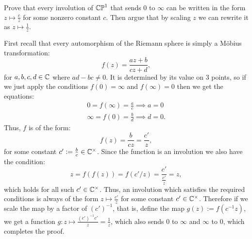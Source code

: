 \documentclass[11pt, a4paper]{article}
\begin{document}
\begin{exercise}
  Prove that every involution of $\mathbb{CP}^1$ that sends $0$ to $\infty$
  can be written in the form $z \mapsto \frac{c}{z}$ for some nonzero
  constant $c$.
  Then argue that by scaling $z$ we can rewrite it as $z \mapsto \frac{1}{z}$.
\end{exercise}
\begin{solution}
  First recall that every automorphism of the Riemann sphere
  is simply a M\"obius transformation:
  \[
    f(z) = \frac{az + b}{cz + d},
  \]
  for $a,b,c,d \in \mathbb{C}$ where $ad - bc \neq 0$.
  It is determined by its value on $3$ points,
  so if we just apply the conditions $f(0) = \infty$
  and $f(\infty)  = 0$ then we get the equations:
  \begin{align*}
    0 = f(\infty) = \frac{a}{c} \implies a = 0 \\
    \infty = f(0) = \frac{b}{d} \implies d = 0.
  \end{align*}
  Thus, $f$ is of the form:
  \[
    f(z) = \frac{b}{cz} =
    \frac{c'}{z},
  \]
  for some constant $c' := \frac{b}{c} \in \mathbb{C}^{\times}$.
  Since the function is an involution we also have the condition:
  \[
    z = f(f(z)) = f(c'/z) = \frac{c'}{\frac{c'}{z}} = z,
  \]
  which holds for all such $c' \in \mathbb{C}^{\times}$.
  Thus, an involution which satisfies the required conditions
  is always of the form $z \mapsto \frac{c'}{z}$ for some constant
  $c' \in \mathbb{C}^{\times}$.
  Therefore if we scale the map by a factor of $(c')^{-1}$,
  that is, define the map $g(z) := f(c^{-1}z)$,
  we get a function $g \colon z \mapsto \frac{(c')^{-1}c'}{z} = \frac{1}{z}$,
  which also sends $0$ to $\infty$ and $\infty$ to $0$,
  which completes the proof.
\end{solution}
\end{document}
